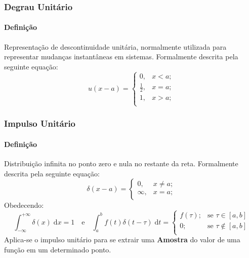 \documentclass{article}
\begin{document}
\subsubsection{Degrau Unitário}
    \paragraph{Definição}Representação de descontinuidade unitária, normalmente utilizada para representar mudanças instantâneas em sistemas. Formalmente descrita pela seguinte equação:
    \begin{equation}
        \boxed{
            u(x - a) = 
            \begin{cases}
                0, & x < a;\\
                \frac{1}{2}, & x = a;\\
                1, & x > a;\\
            \end{cases}
        }
    \end{equation}

\subsubsection{Impulso Unitário}
    \paragraph{Definição}Distribuição infinita no ponto zero e nula no restante da reta. Formalmente descrita pela seguinte equação:
    \begin{equation}
        \boxed{
            \delta(x-a) = 
            \begin{cases}
                0, & x \neq a;\\
                \infty, & x = a;\\
            \end{cases}
            }
        \end{equation}
    Obedecendo:
    \begin{equation*}
        \int_{-\infty}^{+\infty} \delta(x) \; \text{d}x = 1
        \quad\text{e}\quad
        \boxed{
            \int_{a}^{b} f(t) \delta(t - \tau)\;\text{d}t = 
            \begin{cases}
                f(\tau);    & \text{se } \tau\in[a,b]\\
                0;          & \text{se } \tau\notin[a,b]\\
            \end{cases}
        }
    \end{equation*}
    Aplica-se o impulso unitário para se extrair uma \textbf{Amostra} do valor de uma função em um determinado ponto.
\end{document}
